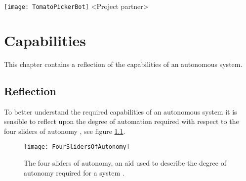 \documentclass[%
oneside,    %
project,    %
nosummary   %
]{USN-MSc}
\newcommand{\myauthor}{%
223786 Lars Rikard Rådstoga
}
\newcommand{\myparticipants}{
<First participant>\\
<Second participant>\\
<Third participant>\\
<Fourth participant>
}
\begin{document}
\USNtitlepage%
{%
  {\normalsize}
  \texttt{[image: TomatoPickerBot]}}
{<Project partner>}
{%
  \lipsum[6-7]
}





\tableofcontents
{}




\chapter{Capabilities}
\label{ch:cap}
This chapter contains a reflection of the capabilities of an autonomous system.
\section{Reflection}
To better understand the required capabilities of an autonomous system it is sensible to reflect upon the degree of automation required with respect to the four sliders of autonomy \cite{murphy2000introduction}, see figure \ref{fig:fourSliders}.

\begin{figure}[!ht]
  \centering
  \texttt{[image: FourSlidersOfAutonomy]}
  \caption{The four sliders of autonomy, an aid used to describe the degree of autonomy required for a system \cite{murphy2000introduction}.}
  \label{fig:fourSliders}
\end{figure}
\end{document}
